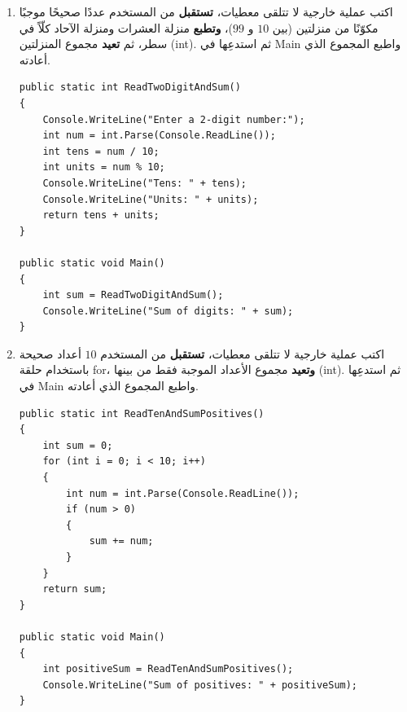 \documentclass[14pt]{extarticle}
\begin{document}
\begin{enumerate}[resume, itemsep=1em]
\begin{boxSolution}
\begin{english}
\begin{verbatim}
public static void Main()
{
    int area = ReadRectanglePrintPerimeterGetArea();
    Console.WriteLine("Area: " + area);
}
\end{verbatim}
\end{english}
\end{boxSolution}
\fi
\filbreak

\item اكتب عملية خارجية لا تتلقى معطيات، \textbf{تستقبل} من المستخدم عددًا صحيحًا موجبًا مكوّنًا من منزلتين (بين $10$ و $99$)، \textbf{وتطبع} منزلة العشرات ومنزلة الآحاد كلّاً في سطر، ثم \textbf{تعيد} مجموع المنزلتين (\textenglish{int}). ثم استدعِها في \textenglish{Main} واطبع المجموع الذي أعادته.
\ifwithsols
\begin{boxSolution}
\begin{english}
\begin{verbatim}
public static int ReadTwoDigitAndSum()
{
    Console.WriteLine("Enter a 2-digit number:");
    int num = int.Parse(Console.ReadLine());
    int tens = num / 10;
    int units = num % 10;
    Console.WriteLine("Tens: " + tens);
    Console.WriteLine("Units: " + units);
    return tens + units;
}

public static void Main()
{
    int sum = ReadTwoDigitAndSum();
    Console.WriteLine("Sum of digits: " + sum);
}
\end{verbatim}
\end{english}
\end{boxSolution}
\fi
\filbreak

\item اكتب عملية خارجية لا تتلقى معطيات، \textbf{تستقبل} من المستخدم $10$ أعداد صحيحة باستخدام حلقة \textenglish{for}، \textbf{وتعيد} مجموع الأعداد الموجبة فقط من بينها (\textenglish{int}). ثم استدعِها في \textenglish{Main} واطبع المجموع الذي أعادته.
\ifwithsols
\begin{boxSolution}
\begin{english}
\begin{verbatim}
public static int ReadTenAndSumPositives()
{
    int sum = 0;
    for (int i = 0; i < 10; i++)
    {
        int num = int.Parse(Console.ReadLine());
        if (num > 0)
        {
            sum += num;
        }
    }
    return sum;
}

public static void Main()
{
    int positiveSum = ReadTenAndSumPositives();
    Console.WriteLine("Sum of positives: " + positiveSum);
}
\end{verbatim}
\end{english}
\end{boxSolution}
\fi
\filbreak

\end{enumerate}
\end{document}

